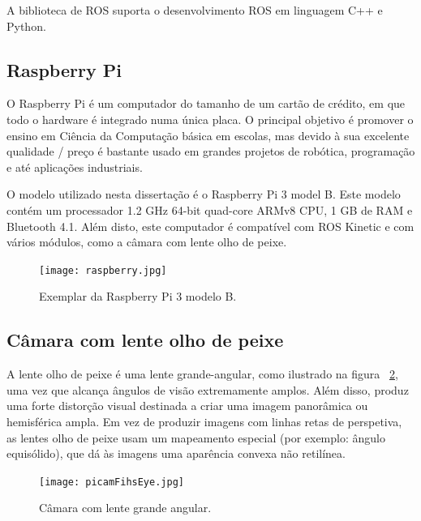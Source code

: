 A biblioteca de ROS suporta o desenvolvimento ROS em linguagem C++ e Python.


\subsection{Raspberry Pi}

O Raspberry Pi é um computador do tamanho de um cartão de crédito, em que todo o hardware é integrado numa única placa. O principal objetivo é promover o ensino em Ciência da Computação básica em escolas, mas devido à sua excelente qualidade / preço é bastante usado em grandes projetos de robótica, programação e até aplicações industriais. 

O modelo utilizado nesta dissertação é o Raspberry Pi 3 model B. Este modelo contém um processador 1.2 GHz 64-bit quad-core ARMv8 CPU, 1 GB de RAM e Bluetooth 4.1. Além disto, este computador é compatível com ROS Kinetic e com vários módulos, como a câmara com lente olho de peixe.

\begin{figure}[h!] %
	\begin{center}
		\leavevmode		
		\texttt{[image: raspberry.jpg]}
		\caption{Exemplar da Raspberry Pi 3 modelo B.}
		\label{fig:raspberry}
	\end{center}
\end{figure}


\pagebreak
\subsection{Câmara com lente olho de peixe}

A lente olho de peixe é uma lente grande-angular, como ilustrado na figura ~\ref{fig:picamFishEye}, uma vez que alcança ângulos de visão extremamente amplos. Além disso, produz uma forte distorção visual destinada a criar uma imagem panorâmica ou hemisférica ampla.  Em vez de produzir imagens com linhas retas de perspetiva, as lentes olho de peixe usam um mapeamento especial (por exemplo: ângulo equisólido), que dá às imagens uma aparência convexa não retilínea.


\begin{figure}[h!]
	\begin{center}
		\leavevmode		
		\texttt{[image: picamFihsEye.jpg]}
		\caption{Câmara com lente grande angular.}
		\label{fig:picamFishEye}
	\end{center}
\end{figure}

